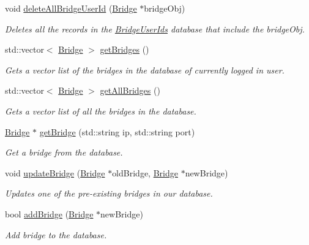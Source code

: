 \begin{DoxyCompactItemize}
void \hyperlink{classSession_ad209a3bf4d24d5f1aff23a011ef25f6f}{delete\+All\+Bridge\+User\+Id} (\hyperlink{classBridge}{Bridge} $\ast$bridge\+Obj)
\begin{DoxyCompactList}\small\item\em Deletes all the records in the \hyperlink{classBridgeUserIds}{Bridge\+User\+Ids} database that include the bridge\+Obj. \end{DoxyCompactList}\item 
std\+::vector$<$ \hyperlink{classBridge}{Bridge} $>$ \hyperlink{classSession_a44ef564f39f3b819313e339c0b174f4f}{get\+Bridges} ()
\begin{DoxyCompactList}\small\item\em Gets a vector list of the bridges in the database of currently logged in user. \end{DoxyCompactList}\item 
std\+::vector$<$ \hyperlink{classBridge}{Bridge} $>$ \hyperlink{classSession_aecaecc666ef5e3344420b36e40d5b0cc}{get\+All\+Bridges} ()
\begin{DoxyCompactList}\small\item\em Gets a vector list of all the bridges in the database. \end{DoxyCompactList}\item 
\hyperlink{classBridge}{Bridge} $\ast$ \hyperlink{classSession_a5731961d665ab9e0a01f5c95b1114f88}{get\+Bridge} (std\+::string ip, std\+::string port)
\begin{DoxyCompactList}\small\item\em Get a bridge from the database. \end{DoxyCompactList}\item 
void \hyperlink{classSession_a617d2b434c7aade62e7bd0c0ee78ea9c}{update\+Bridge} (\hyperlink{classBridge}{Bridge} $\ast$old\+Bridge, \hyperlink{classBridge}{Bridge} $\ast$new\+Bridge)
\begin{DoxyCompactList}\small\item\em Updates one of the pre-\/existing bridges in our database. \end{DoxyCompactList}\item 
bool \hyperlink{classSession_af578feecff75f6eabc70d4110d04b04c}{add\+Bridge} (\hyperlink{classBridge}{Bridge} $\ast$new\+Bridge)
\begin{DoxyCompactList}\small\item\em Add bridge to the database. \end{DoxyCompactList}\item 

\end{DoxyCompactItemize}

